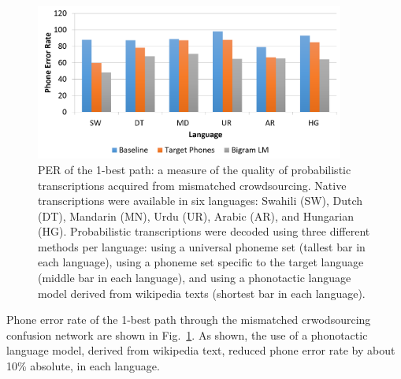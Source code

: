 \begin{figure}
  \centerline{\includegraphics[width=4in]{../figs/sloan2.png}}
  \caption{PER of the 1-best path: a measure of the quality of
    probabilistic transcriptions acquired from mismatched
    crowdsourcing.  Native transcriptions were available in six
    languages: Swahili (SW), Dutch (DT), Mandarin (MN), Urdu (UR),
    Arabic (AR), and Hungarian (HG).  Probabilistic transcriptions
    were decoded using three different methods per language: using a
    universal phoneme set (tallest bar in each language), using a
    phoneme set specific to the target language (middle bar in each
    language), and using a phonotactic language model derived from
    wikipedia texts (shortest bar in each language).}
  \label{fig:pt_decode_per}
\end{figure}

Phone error rate of the 1-best path through the mismatched
crwodsourcing confusion network are shown in
Fig.~\ref{fig:pt_decode_per}.  As shown, the use of a phonotactic
language model, derived from wikipedia text, reduced phone error rate
by about 10\% absolute, in each language.


